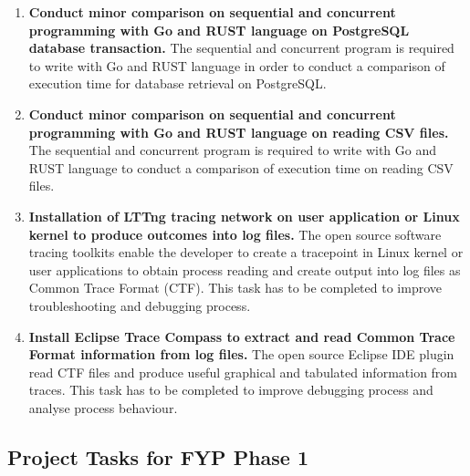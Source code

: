 \begin{enumerate}
\item \textbf{Conduct minor comparison on sequential and concurrent programming with Go and RUST language on PostgreSQL database transaction.} The sequential and concurrent program is required to write with Go and RUST language in order to conduct a comparison of execution time for database retrieval on PostgreSQL.

\item \textbf{Conduct minor comparison on sequential and concurrent programming with Go and RUST language on reading CSV files. } The sequential and concurrent program is required to write with Go and RUST language to conduct a comparison of execution time on reading CSV files.

\item \textbf{Installation of LTTng tracing network on user application or Linux kernel to produce outcomes into log files. } The open source software tracing toolkits enable the developer to create a tracepoint in Linux kernel or user applications to obtain process reading and create output into log files as Common Trace Format (CTF). This task has to be completed to improve troubleshooting and debugging process.

\item \textbf{Install Eclipse Trace Compass to extract and read Common Trace Format information from log files. } The open source Eclipse IDE plugin read CTF files and produce useful graphical and tabulated information from traces. This task has to be completed to improve debugging process and analyse process behaviour.

\end{enumerate}

\pagebreak

\subsection{Project Tasks for FYP Phase 1}

